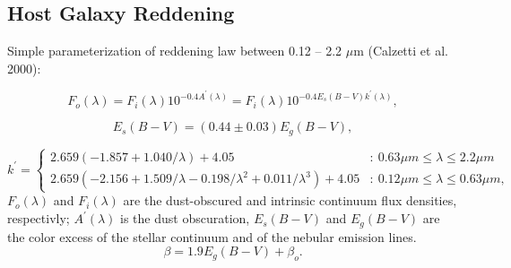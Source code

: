 \documentclass[12pt,letterpaper]{article}
\begin{document}
\subsection*{Host Galaxy Reddening}
Simple parameterization of reddening law between 0.12 -- 2.2 $\mu$m (Calzetti et al. 2000):

\begin{equation}F_o(\lambda) = F_i(\lambda)10^{-0.4A^\prime(\lambda)} = F_i(\lambda)10^{-0.4E_s(B-V)k^\prime(\lambda)},   \end{equation}

\begin{equation} E_s(B-V) = (0.44\pm0.03)E_g(B-V),  \end{equation}

\[ 
k^\prime = 
	\begin{cases}
	2.659(-1.857+1.040/\lambda) + 4.05  & :~0.63 \mu m \leq \lambda \leq 2.2\mu m \\
	2.659(-2.156+1.509/\lambda - 0.198/\lambda^2 + 0.011/\lambda^3) + 4.05 & :~0.12 \mu m \leq \lambda \leq 0.63\mu m,
	\end{cases}
\]
$F_o(\lambda)$ and $F_i(\lambda)$ are the dust-obscured and intrinsic continuum flux densities, respectivly; $A^\prime(\lambda)$ is the dust obscuration, $E_s(B-V)$ and $E_g(B-V)$ are the color excess of the stellar continuum and of the nebular emission lines.
\begin{equation} \beta = 1.9E_g(B-V)+\beta_o.  \end{equation}
\end{document}

